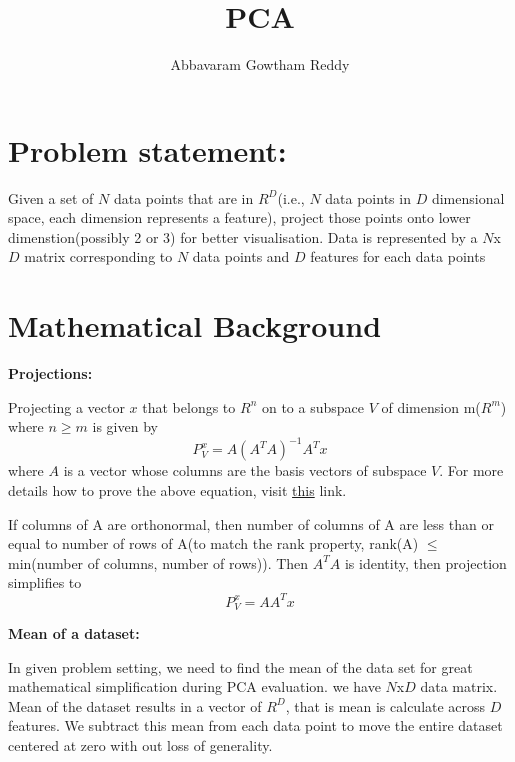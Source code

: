 \documentclass[11pt]{article}
\begin{document}


\author{Abbavaram Gowtham Reddy}
\title{\textbf{PCA}}
\maketitle

\section*{Problem statement:}

Given a set of $N$ data points that are in $R^D$(i.e., $N$ data points in $D$ dimensional space, each dimension represents a feature), project those points onto lower dimenstion(possibly 2 or 3) for better visualisation.
Data is represented by a $N$x$D$ matrix corresponding to $N$ data points and $D$ features for each data points
\section*{Mathematical Background}
\textbf{Projections:}

Projecting a vector $x$ that belongs to $R^n$ on to a subspace $V$ of dimension m($R^m$) where $n \geq m$ is given by  
\begin{equation*}
    P^x_V = A(A^TA)^{-1}A^Tx
\end{equation*}
where $A$ is a vector whose columns are the basis vectors of subspace $V$. For more details how to prove the above equation, visit \href{https://www.youtube.com/watch?v=cTyNpXB92bQ}{this} link.

If columns of A are orthonormal, then number of columns of A are less than or equal to number of rows of A(to match the rank property, rank(A) $\leq$ min(number of columns, number of rows)).
Then $A^TA$ is identity, then projection simplifies to 
\begin{equation}
    P^x_V = AA^Tx
\end{equation}

\noindent
\textbf{Mean of a dataset:}

In given problem setting, we need to find the mean of the data set for great mathematical simplification during PCA evaluation. we have $N$x$D$ data matrix. Mean of the dataset results in a vector of $R^D$, that is mean is calculate across $D$ features.
We subtract this mean from each data point to move the entire dataset centered at zero with out loss of generality.
\end{document}
